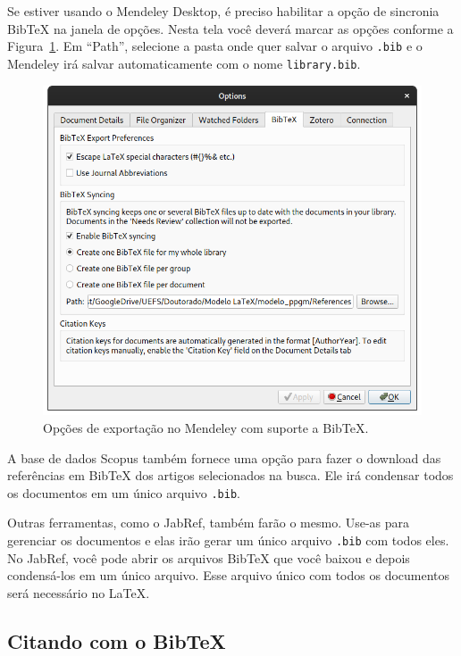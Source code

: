 Se estiver usando o Mendeley Desktop, é preciso habilitar a opção de sincronia BibTeX na janela de opções. Nesta tela você deverá marcar as opções conforme a Figura~\ref{fig:bibtex_mendeley_desktop}. Em ``Path'', selecione a pasta onde quer salvar o arquivo \verb=.bib= e o Mendeley irá salvar automaticamente com o nome \verb=library.bib=.

\begin{figure}[h]
    \centering
    \includegraphics[scale=0.5]{Figures/bibtex_mendeley_desktop.png}
    \caption{Opções de exportação no Mendeley com suporte a BibTeX.}
    \label{fig:bibtex_mendeley_desktop}
\end{figure}

A base de dados Scopus também fornece uma opção para fazer o download das referências em BibTeX dos artigos selecionados na busca. Ele irá condensar todos os documentos em um único arquivo \verb=.bib=.

Outras ferramentas, como o JabRef, também farão o mesmo. Use-as para gerenciar os documentos e elas irão gerar um único arquivo \verb=.bib= com todos eles. No JabRef, você pode abrir os arquivos BibTeX que você baixou e depois condensá-los em um único arquivo. Esse arquivo único com todos os documentos será necessário no \LaTeX.

\subsection{Citando com o BibTeX}
\label{subsec:citando_com_bibtex}

